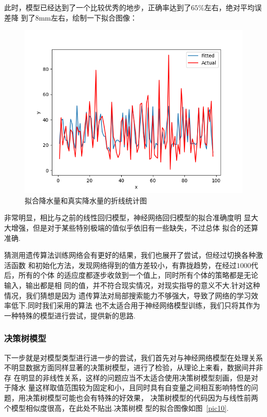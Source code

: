 \documentclass[UTF8, a4paper]{ctexart}
\begin{document}
此时，模型已经达到了一个比较优秀的地步，正确率达到了$65\%$左右，绝对平均误差降
到了$8$\si{\milli\meter}左右，绘制一下拟合图像：

\begin{figure}[h!]
	\centering
	\includegraphics[scale=0.3]{success.png}
	\caption{拟合降水量和真实降水量的折线统计图}
\end{figure}

非常明显，相比与之前的线性回归模型，神经网络回归模型的拟合准确度明
显大大增强，但是对于某些特别极端的值似乎依旧有一些缺失，不过总体
拟合的还算准确.

猜测用遗传算法训练网络会有更好的结果，我们也展开了尝试，但经过切换各种激活函数
和初始化方法，发现网络得到的值方差较小，有靠拢趋势，在经过$1000$代后，所有的个体
的适应度都逐步收敛到一个值上，同时所有个体的策略都是无论输入，输出都是相
同的值，并不符合现实情况，对现实指导的意义不大.针对这种情况，我们猜想是因为
遗传算法对局部搜索能力不够强大，导致了网络的学习效率低下.同时我们采用的算法
也不太适合用于神经网络模型训练，我们只将其作为一种特殊的模型进行尝试，提供新的思路.

\subsubsection{决策树模型}

下一步就是对模型类型进行进一步的尝试，我们首先对与神经网络模型在处理关系
不明显数据方面同样显著的决策树模型，进行了检验，从理论上来看，数据间并非存
在明显的非线性关系，这样的问题应当不太适合使用决策树模型刻画，但是对于降水
量这样取值范围较为固定和小，且同时具有自变量之间相互影响特性的问题，用决策树模型可能也会有特殊的好效果，
决策树模型的代码因为与线性前两个模型相似度很高，在此处不贴出.决策树模
型的拟合图像如图~\textcolor{red}{\ref{pic10}}.
\end{document}
